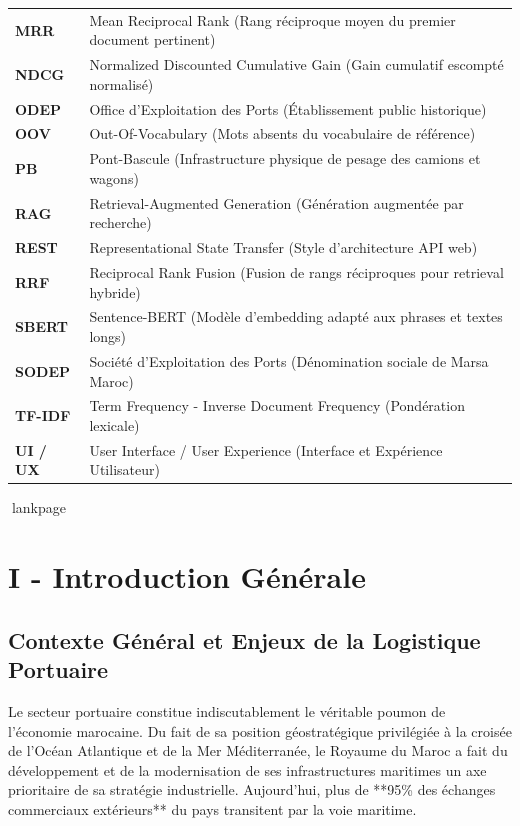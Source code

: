 \documentclass[12pt,a4paper,oneside]{report}
\newcommand{\blankpage}{%
  \newpage
  \thispagestyle{empty}%
  \mbox{}%
  \newpage
}
\begin{document}
\begin{table}[H]
{\begin{tabular}{ll}
\textbf{MRR} & Mean Reciprocal Rank (Rang réciproque moyen du premier document pertinent) \\
\textbf{NDCG} & Normalized Discounted Cumulative Gain (Gain cumulatif escompté normalisé) \\
\textbf{ODEP} & Office d'Exploitation des Ports (Établissement public historique) \\
\textbf{OOV} & Out-Of-Vocabulary (Mots absents du vocabulaire de référence) \\
\textbf{PB} & Pont-Bascule (Infrastructure physique de pesage des camions et wagons) \\
\textbf{RAG} & Retrieval-Augmented Generation (Génération augmentée par recherche) \\
\textbf{REST} & Representational State Transfer (Style d'architecture API web) \\
\textbf{RRF} & Reciprocal Rank Fusion (Fusion de rangs réciproques pour retrieval hybride) \\
\textbf{SBERT} & Sentence-BERT (Modèle d'embedding adapté aux phrases et textes longs) \\
\textbf{SODEP} & Société d'Exploitation des Ports (Dénomination sociale de Marsa Maroc) \\
\textbf{TF-IDF} & Term Frequency - Inverse Document Frequency (Pondération lexicale) \\
\textbf{UI / UX} & User Interface / User Experience (Interface et Expérience Utilisateur) \\
\bottomrule
\end{tabular}%
}
\end{table}

lankpage
\blankpage

\chapter*{I - Introduction Générale}

\section*{Contexte Général et Enjeux de la Logistique Portuaire}
Le secteur portuaire constitue indiscutablement le véritable poumon de l'économie marocaine. Du fait de sa position géostratégique privilégiée à la croisée de l'Océan Atlantique et de la Mer Méditerranée, le Royaume du Maroc a fait du développement et de la modernisation de ses infrastructures maritimes un axe prioritaire de sa stratégie industrielle. Aujourd'hui, plus de **95\% des échanges commerciaux extérieurs** du pays transitent par la voie maritime. 
\end{document}

